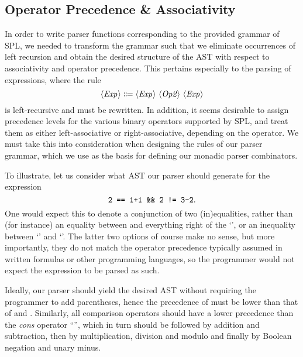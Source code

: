 \subsection{Operator Precedence \& Associativity} \label{sec:precedence-associativity}

In order to write parser functions corresponding to the provided grammar of SPL,
we needed to transform the grammar such that we eliminate occurrences of left
recursion and obtain the desired structure of the AST with respect to
associativity and operator precedence.
This pertains especially to the parsing of expressions, where the rule
\[ \NT{Exp} \Coloneqq \NT{Exp}\ \NT{Op2}\ \NT{Exp} \]
is left-recursive and must be rewritten.
In addition, it seems desirable to assign precedence levels for the various
binary operators supported by SPL, and treat them as either left-associative or
right-associative, depending on the operator.
We must take this into consideration when designing the rules of our parser
grammar, which we use as the basis for defining our monadic parser combinators.

To illustrate, let us consider what AST our parser should generate for the
expression
\[ \texttt{2 == 1+1 \&\& 2 != 3-2} .\]
One would expect this to denote a conjunction of two (in)equalities, rather than
(for instance) an equality between  and everything right of the
`\code{==}', or an inequality between `' and `'.
%
The latter two options of course make no sense, but more importantly, they do
not match the operator precedence typically assumed in written formulas or other
programming languages, so the programmer would not expect the expression to be
parsed as such.

Ideally, our parser should yield the desired AST without requiring the
programmer to add parentheses, hence the precedence of \code{\&\&} must be lower
than that of \code{==} and \code{!=}.
Similarly, all comparison operators should have a lower precedence than the
\emph{cons} operator ``\code{:}'', which in turn should be followed by addition
and subtraction, then by multiplication, division and modulo and finally by
Boolean negation and unary minus.

